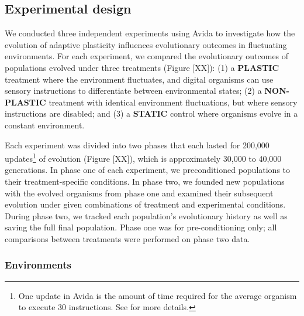 \subsection{Experimental design}
\label{sec:methods:experiment}



We conducted three independent experiments using Avida to investigate how the evolution of adaptive plasticity influences evolutionary outcomes in fluctuating environments.
For each experiment, we compared the evolutionary outcomes of populations evolved under three treatments (Figure [XX]): 
(1) a \textbf{PLASTIC} treatment where the environment fluctuates, and digital organisms can use sensory instructions to differentiate between environmental states;
(2) a \textbf{NON-PLASTIC} treatment with identical environment fluctuations, but where sensory instructions are disabled;
and (3) a \textbf{STATIC} control where organisms evolve in a constant environment.

Each experiment was divided into two phases that each lasted for 200,000 updates\footnote{
    One update in Avida is the amount of time required for the average organism to execute 30 instructions. 
    See \citep{ofria_avida:_2009} for more details.
} of evolution (Figure [XX]), which is approximately 30,000 to 40,000 generations.
In phase one of each experiment, we preconditioned populations to their treatment-specific conditions.
In phase two, we founded new populations with the evolved organisms from phase one and examined their subsequent evolution under given combinations of treatment and experimental conditions.
During phase two, we tracked each population's evolutionary history as well as saving the full final population.
Phase one was for pre-conditioning only; all comparisons between treatments were performed on phase two data.

\vspace{5mm}
\subsubsection{Environments}
\label{sec:methods:experiment:environments}

